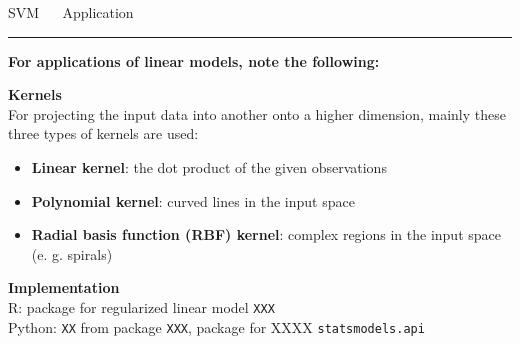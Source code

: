 \documentclass[11pt,compress,t,notes=noshow, xcolor=table]{beamer}
\begin{document}
\LARGE
\begin{frame}{\textcolor{gray!80}{SVM} ~~ Application}
\normalsize
\vspace{-0.5cm}
\noindent \textcolor{gray!80}{\rule{\textwidth}{1pt}}

\vspace{0.3cm}

\footnotesize

\textbf{For applications of linear models, note the following:}

\lz

  \textbf{\textcolor{gray!80}{Kernels}} \\
  \smallskip
 For projecting the input data into another onto a higher dimension, mainly these three types of kernels are used: 
 \begin{itemize}
 
 \item \textbf{Linear kernel}: the dot product of the given observations
 
 \item \textbf{Polynomial kernel}: curved lines in the input space
 
 \item \textbf{Radial basis function (RBF) kernel}: complex regions in the input space (e. g. spirals)
 
 \end{itemize}
 
 

\lz

  \textbf{\textcolor{gray!80}{Implementation}} \\
  \smallskip
  R: package for regularized linear model \texttt{XXX}\\
  Python: \texttt{XX} from package \texttt{XXX}, package for XXXX \texttt{statsmodels.api}

\end{frame}


% 
\end{document}
